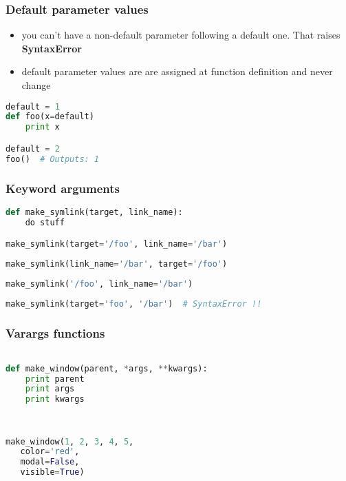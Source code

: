 \documentclass{beamer}
\begin{document}
\begin{frame}[fragile]
\frametitle{Default parameter values}

\begin{itemize}
  \item you can't have a non-default parameter following a default one. That raises {\bf SyntaxError}
  \item default parameter values are are assigned at function definition and never change
\end{itemize}

\pause

\begin{lstlisting}[language=python]
default = 1
def foo(x=default)
    print x

default = 2
foo()  # Outputs: 1
\end{lstlisting}
\end{frame}

\begin{frame}[fragile]
\frametitle{Keyword arguments}

\begin{lstlisting}[language=python]
def make_symlink(target, link_name):
    do stuff

make_symlink(target='/foo', link_name='/bar')
\end{lstlisting}
\pause
\begin{lstlisting}[language=python]
make_symlink(link_name='/bar', target='/foo')
\end{lstlisting}
\pause
\begin{lstlisting}[language=python]
make_symlink('/foo', link_name='/bar')
\end{lstlisting}
\pause
\begin{lstlisting}[language=python]
make_symlink(target='foo', '/bar')  # SyntaxError !!
\end{lstlisting}
\end{frame}


\begin{frame}[fragile]
\frametitle{Varargs functions}

\begin{lstlisting}[language=python]

def make_window(parent, *args, **kwargs):
    print parent
    print args     
    print kwargs   
                   
                   

make_window(1, 2, 3, 4, 5,
   color='red',
   modal=False,
   visible=True)

\end{lstlisting}
\end{frame}
\end{document}
